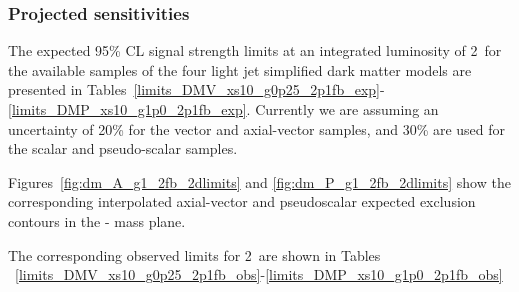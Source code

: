 \subsubsection{Projected sensitivities}

The expected 95\% CL signal strength limits at an integrated luminosity of 2~\ifb for
the available samples of the four light jet simplified dark matter models are
presented in
Tables~\ref{limits_DMV_xs10_g0p25_2p1fb_exp}-\ref{limits_DMP_xs10_g1p0_2p1fb_exp}.
Currently we are assuming an uncertainty of 20\% for the vector and axial-vector samples, and 30\% are used 
for the scalar and pseudo-scalar samples.


Figures~\ref{fig:dm_A_g1_2fb_2dlimits} and \ref{fig:dm_P_g1_2fb_2dlimits} show
the corresponding interpolated axial-vector and pseudoscalar expected exclusion 
contours in the {\mphi-\mchi} mass plane.



\clearpage
%
% 
%
%


 
 
 

\clearpage
The corresponding observed limits for 2~\ifb are shown in Tables
~\ref{limits_DMV_xs10_g0p25_2p1fb_obs}-\ref{limits_DMP_xs10_g1p0_2p1fb_obs}



 
 
 



%
%



%
%


